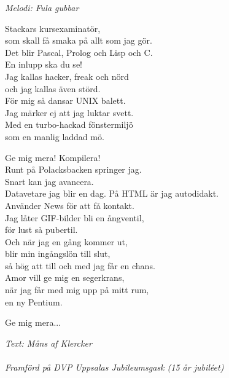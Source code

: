 {\footnotesize\textit{Melodi: Fula gubbar}}\par
\vspace{10pt}
Stackars kursexaminatör,\\
som skall få smaka på allt som jag gör.\\
Det blir Pascal, Prolog och Lisp och C.\\
En inlupp ska du se!\\
Jag kallas hacker, freak och nörd\\
och jag kallas även störd.\\
För mig så dansar UNIX balett.\\
Jag märker ej att jag luktar svett.\\
Med en turbo-hackad fönstermiljö\\
som en manlig laddad mö.\par
\vspace{10pt}
Ge mig mera! Kompilera!\\
Runt på Polacksbacken springer jag.\\
Snart kan jag avancera.\\
Datavetare jag blir en dag.
\newpage
På HTML är jag autodidakt.\\
Använder News för att få kontakt.\\
Jag låter GIF-bilder bli en ångventil,\\
för lust så pubertil.\\
Och när jag en gång kommer ut,\\
blir min ingångslön till slut,\\
så hög att till och med jag får en chans.\\
Amor vill ge mig en segerkrans,\\
när jag får med mig upp på mitt rum,\\
en ny Pentium.\par
\vspace{10pt}
Ge mig mera...\par
\vspace{10pt}
{\footnotesize\textit{Text: Måns af Klercker\\ \\ Framförd på DVP
      Uppsalas Jubileumsgask (15 år jubiléet)}}
